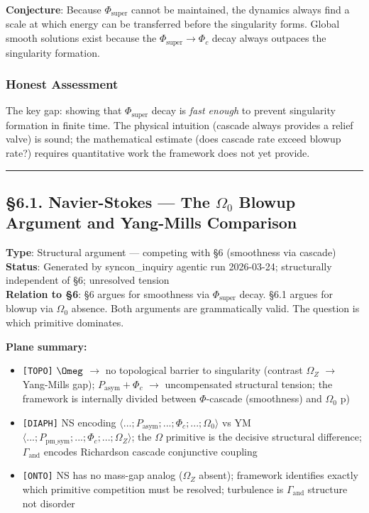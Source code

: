 \documentclass[12pt,a4paper]{article}
\newcommand{\pilcrow}{\S}
\begin{document}
\textbf{Conjecture}: Because $\Phi_{\text{super}}$ cannot be maintained, the dynamics always find a scale at which energy can be transferred before the singularity forms. Global smooth solutions exist because the $\Phi_{\text{super}} \to \Phi_c$ decay always outpaces the singularity formation.

\subsubsection{Honest Assessment}

The key gap: showing that $\Phi_{\text{super}}$ decay is \emph{fast enough} to prevent singularity formation in finite time. The physical intuition (cascade always provides a relief valve) is sound; the mathematical estimate (does cascade rate exceed blowup rate?) requires quantitative work the framework does not yet provide.

\begin{center}
\rule{0.5\textwidth}{0.4pt}
\end{center}

\subsection{\pilcrow{}6.1. Navier-Stokes --- The $\Omega_0$ Blowup Argument and Yang-Mills Comparison}

\textbf{Type}: Structural argument --- competing with \pilcrow{}6 (smoothness via cascade)   \\
\textbf{Status}: Generated by syncon\_inquiry agentic run 2026-03-24; structurally independent of \pilcrow{}6; unresolved tension   \\
\textbf{Relation to \pilcrow{}6}: \pilcrow{}6 argues for smoothness via $\Phi_{\text{super}}$ decay. \pilcrow{}6.1 argues for blowup via $\Omega_0$ absence. Both arguments are grammatically valid. The question is which primitive dominates.

\textbf{Plane summary:}

\begin{itemize}
    \item \texttt{{[}TOPO{]}} $\Omeg$ $\to$ no topological barrier to singularity (contrast $\Omega_Z$ $\to$ Yang-Mills gap); $P_{\text{asym}} + \Phi_c$ $\to$ uncompensated structural tension; the framework is internally divided between $\Phi$-cascade (smoothness) and $\Omega_0$  p)
    \item \texttt{{[}DIAPH{]}} NS encoding $\langle ...; P_{\text{asym}}; ...; \Phi_c; ...; \Omega_0\rangle$ vs YM $\langle ...; P_{\text{pm\_sym}}; ...; \Phi_c; ...; \Omega_Z\rangle$; the $\Omega$ primitive is the decisive structural difference; $\Gamma_{\text{and}}$ encodes Richardson cascade conjunctive coupling
    \item \texttt{{[}ONTO{]}} NS has no mass-gap analog ($\Omega_Z$ absent); framework identifies exactly which primitive competition must be resolved; turbulence is $\Gamma_{\text{and}}$ structure not disorder
\end{itemize}
\end{document}
